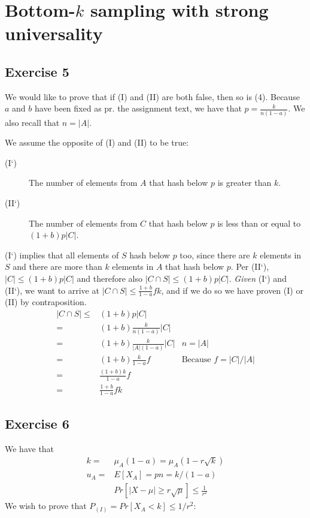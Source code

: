 \section{Bottom-$k$ sampling with strong universality}
\subsection{Exercise 5}
We would like to prove that if (I) and (II) are both false, then 
so is (4). Because $a$ and $b$ have been fixed as pr. the
assignment text, we have that $p=\frac{k}{n(1-a)}$. We also recall
that $n=|A|$.

We assume the opposite of (I) and (II) to be true:
%
\begin{description}
	\item[(I`)] The number of elements from $A$ that hash below $p$
	is greater than $k$.
	\item[(II`)] The number of elements from $C$ that hash below $p$
	is less than or equal to $(1+b) p |C|$.
\end{description}
%
(I`) implies that all elements of $S$ hash below $p$ too, since there are $k$
elements in $S$ and there are more than $k$ elements in $A$ that hash below
$p$. Per (II`), $|C|\leq (1+b)p|C|$ and therefore also 
$|C \cap S| \leq (1+b)p|C|$. \textit{Given} (I`) and (II`), we want to arrive 
at $|C \cap S| \leq \frac{1+b}{1-a} fk$, and if we do so we have proven (I) 
or (II) by contraposition.
%
\begin{align*}
	|C \cap S| 	\leq & (1+b)p|C| & \\
				=& (1+b) \frac{k}{n(1-a)} |C| & \\
				=& (1+b) \frac{k}{|A|(1-a)} |C| & \text{$n=|A|$}\\
				=& (1+b) \frac{k}{1-a} f & \text{Because $f=|C|/|A|$}\\
				=& \frac{(1+b)k}{1-a} f & \\
				=& \frac{1+b}{1-a} fk & 
\end{align*}

\subsection{Exercise 6}
We have that
%
\begin{align}
	k =& \mu_A(1-a) = \mu_A(1 - r \sqrt{k}) \label{eq:6:k} \\
	u_A =& E[X_A] = pn = k/(1-a) \label{eq:6:ua} \\
	& Pr\left[ |X - \mu| \geq r \sqrt{\mu} \right] \leq \frac{1}{r^2} \label{eq:6:pr}
\end{align}
%
We wish to prove that $P_{(I)} = Pr \left[ X_A < k\right] \leq 1/r^2$:

